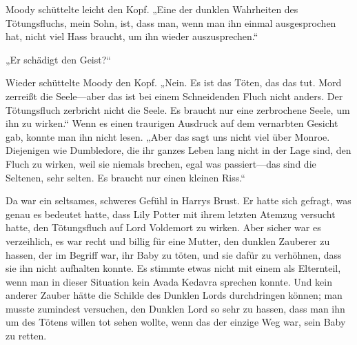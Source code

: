 Moody schüttelte leicht den Kopf.
„Eine der dunklen Wahrheiten des Tötungsfluchs, mein Sohn, ist, dass man, wenn man ihn einmal ausgesprochen hat, nicht viel Hass braucht, um ihn wieder auszusprechen.“

„Er schädigt den Geist?“

Wieder schüttelte Moody den Kopf. „Nein. Es ist das Töten, das das tut. Mord zerreißt die Seele—aber das ist bei einem Schneidenden Fluch nicht anders. Der Tötungsfluch zerbricht nicht die Seele. Es braucht nur eine zerbrochene Seele, um ihn zu wirken.“
Wenn es einen traurigen Ausdruck auf dem vernarbten Gesicht gab, konnte man ihn nicht lesen.
„Aber das sagt uns nicht viel über Monroe. Diejenigen wie Dumbledore, die ihr ganzes Leben lang nicht in der Lage sind, den Fluch zu wirken, weil sie niemals brechen, egal was passiert—das sind die Seltenen, sehr selten. Es braucht nur einen kleinen Riss.“

Da war ein seltsames, schweres Gefühl in Harrys Brust. Er hatte sich gefragt, was genau es bedeutet hatte, dass Lily Potter mit ihrem letzten Atemzug versucht hatte, den Tötungsfluch auf Lord Voldemort zu wirken. Aber sicher war es verzeihlich, es war recht und billig für eine Mutter, den dunklen Zauberer zu hassen, der im Begriff war, ihr Baby zu töten, und sie dafür zu verhöhnen, dass sie ihn nicht aufhalten konnte. Es stimmte etwas nicht mit einem als Elternteil, wenn man in dieser Situation kein Avada Kedavra sprechen konnte. Und kein anderer Zauber hätte die Schilde des Dunklen Lords durchdringen können; man musste zumindest versuchen, den Dunklen Lord so sehr zu hassen, dass man ihn um des Tötens willen tot sehen wollte, wenn das der einzige Weg war, sein Baby zu retten.

